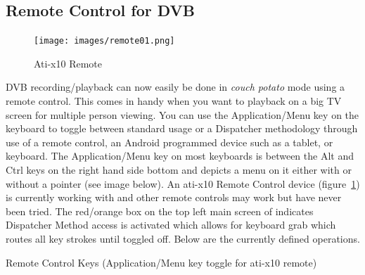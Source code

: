 \subsection{Remote Control for DVB}%
\label{sub:remote_control_dvb}

\begin{figure} 
    \centering
    \texttt{[image: images/remote01.png]}
    \caption{Ati-x10 Remote}
    \label{fig:remote01}
\end{figure}

\CGG{} DVB recording/playback can now easily be done in \textit{couch potato} mode using a remote control.  This comes in handy when you want to playback on a big TV screen for multiple person viewing. You can use the Application/Menu key on the keyboard to toggle between standard \CGG{} usage or a Dispatcher methodology through use of a remote control, an Android programmed device such as a tablet, or keyboard. The Application/Menu key on most keyboards is between the Alt and Ctrl keys on the right hand side bottom and depicts a menu on it either with or without a pointer (see image below).  An ati-x10 Remote Control device (figure~\ref{fig:remote01}) is currently working with \CGG{} and other remote controls may work but have never been tried.  The red/orange box on the top left main screen of \CGG{}  indicates Dispatcher Method access is activated which allows for keyboard grab which routes all key strokes until toggled off.  Below are the currently defined operations.
\newline

Remote Control Keys (Application/Menu key toggle for ati-x10 remote)

